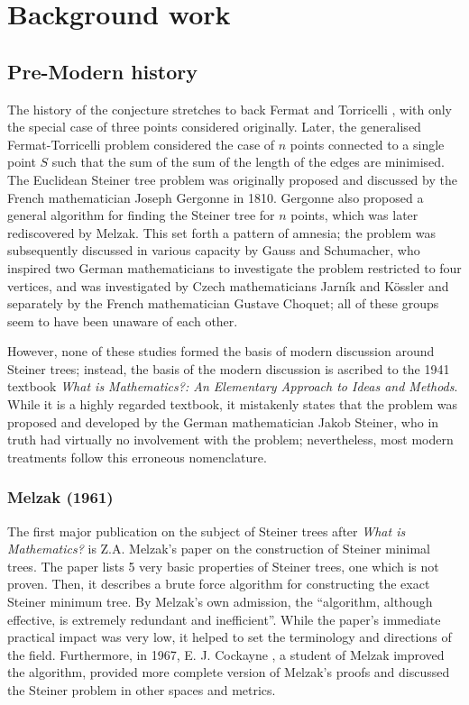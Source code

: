 \documentclass{mpaper}
\begin{document}
\section{Background work}
\subsection{Pre-Modern history}

The history of the conjecture stretches to back Fermat and Torricelli \cite{Brazil2014}, with only the special case of three points considered originally. Later, the generalised Fermat-Torricelli problem considered the case of $n$ points connected to a single point $S$ such that the sum of the sum of the length of the edges are minimised. The Euclidean Steiner tree problem was originally proposed and discussed by  the French mathematician Joseph Gergonne in 1810. Gergonne also proposed a general algorithm for finding the Steiner tree for $n$ points, which was later rediscovered by Melzak. This set forth a pattern of amnesia; the problem was subsequently discussed in various capacity by Gauss and Schumacher, who inspired two German mathematicians to investigate the problem restricted to four vertices, and was investigated by Czech mathematicians Jarník and Kössler and separately by the French mathematician Gustave Choquet; all of these groups seem to have been unaware of each other.

However, none of these studies formed the basis of modern discussion around Steiner trees; instead, the basis of the modern discussion is ascribed to the 1941 textbook \emph{What is Mathematics?: An Elementary Approach to Ideas and Methods}\cite{courant1996mathematics}. While it is a highly regarded textbook, it mistakenly states that the problem was proposed and developed by the German mathematician Jakob Steiner, who in truth had virtually no involvement with the problem; nevertheless, most modern treatments follow this erroneous nomenclature.

\subsubsection{Melzak (1961) \cite{melzak_1961}}
The first major publication on the subject of Steiner trees after \emph{What is Mathematics?} is Z.A. Melzak's paper on the construction of Steiner minimal trees. The paper lists 5 very basic properties of Steiner trees, one which is not proven. Then, it describes a brute force algorithm for constructing the exact Steiner minimum tree. By Melzak's own admission, the ``algorithm, although effective, is extremely redundant and inefficient''. While the paper's immediate practical impact was very low, it helped to set the terminology and directions of the field. Furthermore, in 1967,  E. J. Cockayne \cite{cockayne_1967}, a student of Melzak improved the algorithm, provided more complete version of Melzak's proofs and discussed the Steiner problem in other spaces and metrics.
\end{document}
